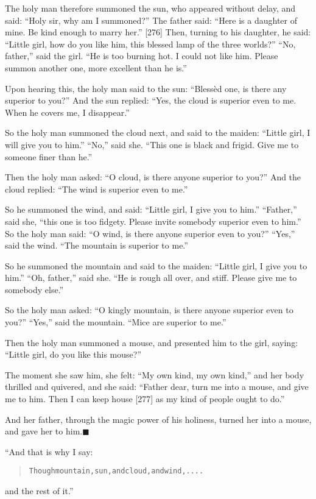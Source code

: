 \documentclass[article, twoside, 14pt]{memoir}
\newcommand{\qed}{\hfill \ensuremath{\blacksquare}}
\renewenvironment{verbatim}{%
\begin{quote}%
\vskip -10pt%
\begin{alltt}\normalfont\large}{\end{alltt}%
\end{quote}%
\vskip -10pt
} %
\begin{document}
The holy man therefore summoned the sun, who appeared without
delay, and said: ``Holy sir, why am I summoned?'' The father said:
``Here is a daughter of mine. Be kind enough to marry her.'' [276]
Then, turning to his daughter, he said:
``Little girl, how do you like him, this blessed lamp of the three worlds?''
``No, father,'' said the girl.
``He is too burning hot. I could not like him. Please summon another one, more excellent than he is.''

Upon hearing this, the holy man said to the sun:
``Blessèd one, is there any superior to you?'' And the sun replied:
``Yes, the cloud is superior even to me. When he covers me, I disappear.''

So the holy man summoned the cloud next, and said to the maiden:
``Little girl, I will give you to him.'' ``No,'' said she.
``This one is black and frigid. Give me to someone finer than he.''

Then the holy man asked:
``O cloud, is there anyone superior to you?'' And the cloud
replied: ``The wind is superior even to me.''

So he summoned the wind, and said:
``Little girl, I give you to him.'' ``Father,'' said she,
``this one is too fidgety. Please invite somebody superior even to him.''
So the holy man said:
``O wind, is there anyone superior even to you?'' ``Yes,'' said the
wind. ``The mountain is superior to me.''

So he summoned the mountain and said to the maiden:
``Little girl, I give you to him.'' ``Oh, father,'' said she.
``He is rough all over, and stiff. Please give me to somebody else.''

So the holy man asked:
``O kingly mountain, is there anyone superior even to you?''
``Yes,'' said the mountain. ``Mice are superior to me.''

Then the holy man summoned a mouse, and presented him to the girl,
saying: ``Little girl, do you like this mouse?''

The moment she saw him, she felt: ``My own kind, my own kind,'' and
her body thrilled and quivered, and she said:
``Father dear, turn me into a mouse, and give me to him. Then I can keep house [277] as my kind of people ought to do.''

And her father, through the magic power of his holiness, turned her
into a mouse, and gave her to him.\hyperref[s60]{\qed}

“And that is why I say:

\begin{verbatim}
Though mountain, sun, and cloud, and wind, ....
\end{verbatim}
and the rest of it.”
\end{document}
